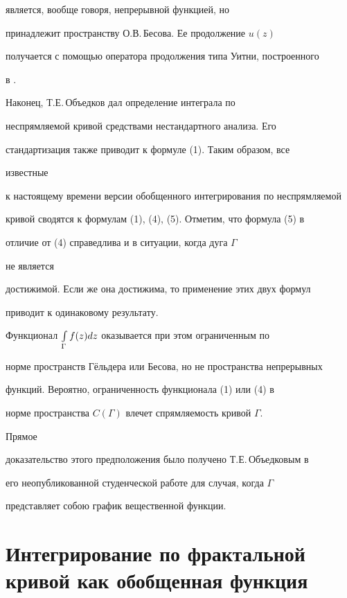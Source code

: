 является, вообще говоря, непрерывной функцией, но 


принадлежит пространству О.В.\,Бесова. Ее продолжение $u(z)$ 


получается с помощью оператора продолжения типа Уитни, построенного 


в \cite{10}. 


 


Наконец, Т.Е.\,Объедков \cite{11} дал определение интеграла по 


неспрямляемой кривой средствами нестандартного анализа. Его  


стандартизация также приводит к формуле (1). Таким образом, все 


известные 


к настоящему времени версии обобщенного интегрирования по неспрямляемой 


кривой сводятся к формулам (1), (4), (5). Отметим, что формула (5) в 


отличие от (4) справедлива и в ситуации, когда дуга $\Gamma$ 


не является 


достижимой. Если же она достижима, то применение этих двух формул 


приводит к одинаковому результату. 


 


Функционал $\int\limits_\Gamma f(z)dz$ оказывается при этом ограниченным по 


норме пространств Г\"ельдера или Бесова, но не пространства непрерывных 


функций. Вероятно, ограниченность функционала (1) или (4) в 


норме пространства $C(\Gamma)$ влечет спрямляемость кривой $\Gamma$. 


Прямое 


доказательство этого предположения было получено Т.Е.\,Объедковым в 


его неопубликованной студенческой работе для случая, когда $\Gamma$ 


представляет собою график вещественной функции. 


 


\section{Интегрирование по фрактальной кривой как обобщенная функция} 


